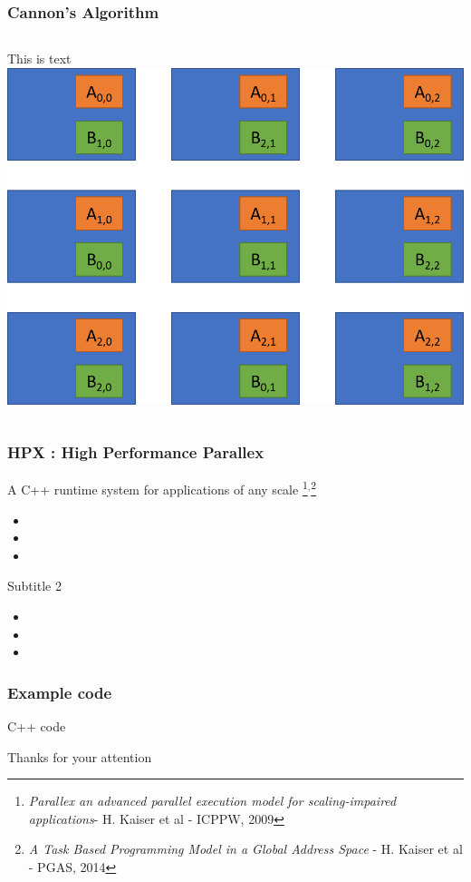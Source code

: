 \documentclass[svgnames]{beamer}
\begin{document}
\begin{frame}
	\frametitle{Cannon's Algorithm}
	\begin{columns}
		This is text
		\includegraphics[width=1.0\textwidth]{step_0_cannon}
	\end{columns}
\end{frame}
\begin{frame}
\frametitle{HPX : High Performance Parallex}
\begin{block}{A C++ runtime system for applications of any scale \footnote{\tiny\textit
{Parallex an advanced parallel execution model for scaling-impaired applications}-
H. Kaiser et al - ICPPW, 2009}$^{,}$\footnote{\tiny\textit{A Task Based Programming Model in
a Global Address Space} - H. Kaiser et al - PGAS, 2014\newline}}
    \begin{itemize}
    \item
    \item
    \item
    \end{itemize}
\end{block}
\begin{block}{Subtitle 2}
    \begin{itemize}
    \item
    \item
    \item
    \end{itemize}
\end{block}
\end{frame}
\begin{frame}
\frametitle{Example code}
\begin{block}{C++ code}
    \vspace{0.3cm}
    \cppexample
\end{block}
\end{frame}
\begin{frame}
\begin{center}\LARGE Thanks for your attention\end{center}
\end{frame}
\end{document}
